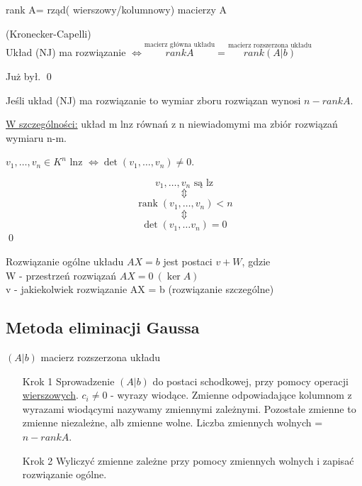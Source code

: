\begin{ozn}
    rank A= rząd( wierszowy/kolumnowy) macierzy A
\end{ozn} 

\begin{tw} (Kronecker-Capelli) \\ 
    Układ (NJ) ma rozwiązanie $\Leftrightarrow \overset{\text{macierz główna układu}}{rank A} = \overset{\text{macierz rozszerzona układu}}{rank(A|b)}$
\end{tw}

\begin{dd}
    Już był. \qed
\end{dd}

\begin{tw}
    Jeśli układ (NJ) ma rozwiązanie to wymiar zboru rozwiązan wynosi $n - rank A$. 
\end{tw}
\underline{W szczególności:} układ m lnz równań z n niewiadomymi ma zbiór rozwiązań wymiaru n-m.

\begin{ft}
    $v_1,\dots,v_n \in K ^n $ lnz $ \Leftrightarrow \det(v_1,\dots,v_n) \neq 0$.
\end{ft}
\begin{dd} 
    $$ v_1, \ldots, v_n \text{ są lz}$$
    $$\Updownarrow$$ 
    $$ \operatorname{rank} (v_1, \dots , v_n) < n $$  
   $$ \Updownarrow $$  
   $$ \det (v_1,\dots v_n) = 0 $$ \hfill \qed 
\end{dd} 

\begin{tw} Rozwiązanie ogólne układu $AX = b$ jest postaci $v + W$, gdzie \\
    W - przestrzeń rozwiązań $AX = 0 \ (\ker A)$\\ 
    v - jakiekolwiek rozwiązanie AX = b (rozwiązanie szczególne)
\end{tw} 
\subsection{Metoda eliminacji Gaussa} 
    $(A |b)$ macierz rozszerzona układu    
    \begin{itemize} 
        \item[Krok 1]   Sprowadzenie $(A |b)$ do postaci schodkowej, przy pomocy operacji \underline{wierszowych}. 
        $c_i \neq 0$ - wyrazy wiodące. Zmienne odpowiadające kolumnom z wyrazami wiodącymi nazywamy zmiennymi
        zależnymi. Pozostałe zmienne to zmienne niezależne, alb zmienne wolne. 
        Liczba zmiennych wolnych = $n - rank A$. 
        \item[Krok 2] Wyliczyć zmienne zależne przy pomocy zmiennych wolnych i zapisać rozwiązanie ogólne.
    \end{itemize} 
